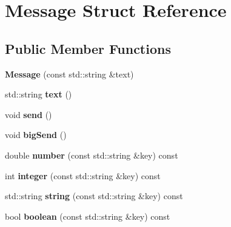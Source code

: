 \hypertarget{structMessage}{}\section{Message Struct Reference}
\label{structMessage}
\subsection*{Public Member Functions}
\begin{DoxyCompactItemize}
\item 
\mbox{\label{structMessage_a5a9039f0cad6557ac75812d25be50ac8}} 
{\bfseries Message} (const std\+::string \&text)
\item 
\mbox{\label{structMessage_a7e93ac9c9e381104189a00b7aabdb1d5}} 
std\+::string {\bfseries text} ()
\item 
\mbox{\label{structMessage_a6d29dfff8b2c60ad5e1607e406ab16ae}} 
void {\bfseries send} ()
\item 
\mbox{\label{structMessage_a508c02bc99ad9ce50e126f7d32631be2}} 
void {\bfseries big\+Send} ()
\item 
\mbox{\label{structMessage_a38316155aff71ea12fc3f66a1a463ab0}} 
double {\bfseries number} (const std\+::string \&key) const
\item 
\mbox{\label{structMessage_a1651453c7fa6cbe6676adab451025a32}} 
int {\bfseries integer} (const std\+::string \&key) const
\item 
\mbox{\label{structMessage_a69fad2186f7767460e1e6758b3090dc0}} 
std\+::string {\bfseries string} (const std\+::string \&key) const
\item 
\mbox{\label{structMessage_a7cb4297d790407676b91edd8652e400a}} 
bool {\bfseries boolean} (const std\+::string \&key) const
\end{DoxyCompactItemize}
